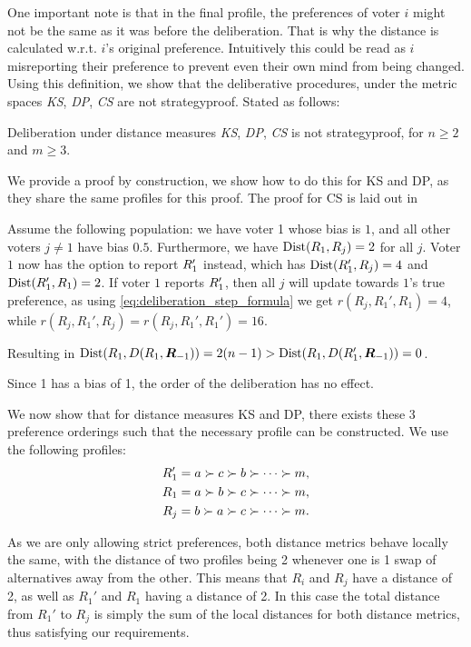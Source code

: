 One important note is that in the final profile, the preferences of voter \(i\) might not be the same as it was before the deliberation. That is why the distance is calculated w.r.t. \(i\)'s original preference. Intuitively this could be read as \(i\) misreporting their preference to prevent even their own mind from being changed.
Using this definition, we show that the deliberative procedures, under the metric spaces \emph{KS}, \emph{ DP}, \emph{ CS} are not strategyproof. Stated as follows:

\begin{proposition}
	Deliberation under distance measures \emph{KS}, \emph{ DP}, \emph{ CS} is not strategyproof, for $n \geq 2$ and $m \geq 3$.
\end{proposition}
We provide a proof by construction, we show how to do this for KS and DP, as they share the same profiles for this proof. The proof for CS is laid out in 
\begin{proofc}
	Assume the following population: we have voter 1 whose bias is $1$, and all other voters $j \neq 1$ have bias $0.5$. Furthermore, we have $\operatorname{Dist}(R_1, R_j) = 2$ for all $j$. Voter $1$ now has the option to report $R_{1}'$ instead, which has $\operatorname{Dist}(R_{1}', R_j) = 4$ and $\operatorname{Dist}(R_{1}', R_1) = 2$. If voter $1$ reports $R_1'$, then all $j$ will update towards $1$'s true preference, as using \cref{eq:deliberation_step_formula} we get $r(R_{j}, R_{1}', R_1) = 4$, while $r(R_{j}, R_{1}', R_j) = r(R_{j}, R_{1}', R_1') = 16$.

	Resulting in $\operatorname{Dist}(R_{1}, D(R_{1},\boldsymbol{R}_{-1})) = 2(n-1) >  \operatorname{Dist}(R_{1}, D(R_{1}', \boldsymbol{R}_{-1})) = 0$.

	Since 1 has a bias of 1, the order of the deliberation has no effect.

	We now show that for distance measures KS and DP, there exists these 3 preference orderings such that the necessary profile can be constructed. We use the following profiles:
	\[
		\begin{aligned}
			R_{1}' & = a \succ c \succ b \succ \cdots \succ m, \\
			R_{1}  & = a \succ b \succ c \succ \cdots \succ m, \\
			R_{j}  & = b \succ a \succ c \succ \cdots \succ m. \\
		\end{aligned}
	\]

	As we are only allowing strict preferences, both distance metrics behave locally the same, with the distance of two profiles being 2 whenever one is 1 swap of alternatives away from the other. This means that  \(R_{i}\) and \(R_{j}\) have a distance of 2, as well as  \(R_{1}'\) and \(R_{1}\) having a distance of 2. In this case the total distance from \(R_{1}'\) to \(R_{j}\) is simply the sum of the local distances for both distance metrics, thus satisfying our requirements.
\end{proofc}


